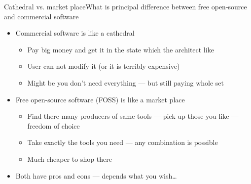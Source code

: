 \documentclass[compress, ucs, xelatex, 11pt, xcolor=svgnames,
  hyperref={
    bookmarks=true,
    unicode=true,
    colorlinks=true,
    pdftitle={Linux, command line and MetaCentrum},
    plainpages=false,
    pdfauthor={Vojtech Zeisek},
    pdfsubject={Course about use of Linux command line, writing shell scripts and using MetaCentrum of CESNET},
    pdfcreator={XeLaTeX},
    pdfkeywords={Linux, GNU, BASH, shell, command line, MetaCentrum},
    linkcolor=DarkRed,
    anchorcolor=DarkBlue,
    citecolor=Indigo,
    filecolor=NavyBlue,
    menucolor=DarkMagenta,
    urlcolor=DarkBlue,
    pdftex},
  url={hyphens, lowtilde} %
  ]{beamer}
\begin{document}
\begin{frame}{Cathedral vs. market place}{What is principal difference between free open-source and commercial software}
  \begin{itemize}
    \item Commercial software is like a cathedral
    \begin{itemize}
      \item Pay big money and get it in the state which the architect like
      \item User can not modify it (or it is terribly expensive)
      \item Might be you don't need everything --- but still paying whole set
    \end{itemize}
    \item Free open-source software (FOSS) is like a market place
    \begin{itemize}
      \item Find there many producers of same tools --- pick up those you like --- freedom of choice
      \item Take exactly the tools you need --- any combination is possible
      \item Much cheaper to shop there
    \end{itemize}
    \item Both have pros and cons --- depends what you wish\ldots
  \end{itemize}
\end{frame}
\end{document}
